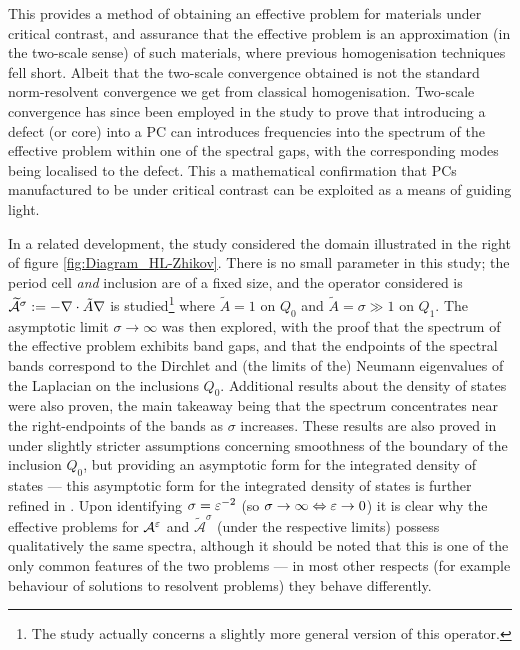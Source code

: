 This provides a method of obtaining an effective problem for materials under critical contrast, and assurance that the effective problem is an approximation (in the two-scale sense) of such materials, where previous homogenisation techniques fell short.
Albeit that the two-scale convergence obtained is not the standard norm-resolvent convergence we get from classical homogenisation.
Two-scale convergence has since been employed in the study \cite{kamotski2018localized} to prove that introducing a defect (or core) into a PC can introduces frequencies into the spectrum of the effective problem within one of the spectral gaps, with the corresponding modes being localised to the defect.
This a mathematical confirmation that PCs manufactured to be under critical contrast can be exploited as a means of guiding light.

In a related development, the study \cite{hempel2000spectral} considered the domain illustrated in the right of figure \ref{fig:Diagram_HL-Zhikov}.
There is no small parameter in this study; the period cell \emph{and} inclusion are of a fixed size, and the operator considered is $\widetilde{\mathcal{A}}^\sigma:=-\nabla\cdot\tilde{A}\nabla$ is studied\footnote{The study \cite{hempel2000spectral} actually concerns a slightly more general version of this operator.} where $\widetilde{A}=1$ on $Q_0$ and $\widetilde{A}=\sigma\gg 1$ on $Q_1$.
The asymptotic limit $\sigma\rightarrow\infty$ was then explored, with the proof that the spectrum of the effective problem exhibits band gaps, and that the endpoints of the spectral bands correspond to the Dirchlet and (the limits of the) Neumann eigenvalues of the Laplacian on the inclusions $Q_0$.
Additional results about the density of states were also proven, the main takeaway being that the spectrum concentrates near the right-endpoints of the bands as $\sigma$ increases. 
These results are also proved in \cite{friedlander2002density} under slightly stricter assumptions concerning smoothness of the boundary of the inclusion $Q_0$, but providing an asymptotic form for the integrated density of states --- this asymptotic form for the integrated density of states is further refined in \cite{selden2005periodic}. 
Upon identifying $\sigma=\varepsilon^{-2}$ (so $\sigma\rightarrow\infty \Leftrightarrow \varepsilon\rightarrow0$) it is clear why the effective problems for $\mathcal{A}^{\varepsilon}$ and $\widetilde{\mathcal{A}}^{\sigma}$ (under the respective limits) possess qualitatively the same spectra, although it should be noted that this is one of the only common features of the two problems --- in most other respects (for example behaviour of solutions to resolvent problems) they behave differently.
